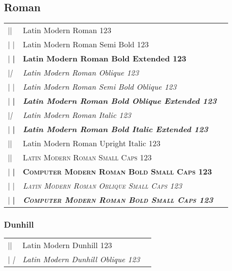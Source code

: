 \documentclass[a4paper]{article}
\makeatletter
\newenvironment{vrb}{\begin{tabular}{@{}p{5cm}ll@{}}}{\end{tabular}}
\def\samplefont{\edef\savedname{\fontname\font}{\normalfont\ttfamily\savedname}}
\def\samplefont{}
\makeatother
\begin{document}
\subsection*{Roman}

\rmfamily
\begin{vrb}
|\rmfamily| & {Latin Modern Roman 123} & {\samplefont} \\
|  \sbweight| & {\sbweight Latin Modern Roman Semi Bold 123} & {\sbweight\samplefont} \\
|  \bfseries| & {\bfseries Latin Modern Roman Bold Extended 123} & {\bfseries\samplefont} \\
|\slshape| & {\slshape Latin Modern Roman Oblique 123} & {\slshape\samplefont} \\
|  \sbweight| & {\sbweight\slshape Latin Modern Roman Semi Bold Oblique 123} & {\sbweight\slshape\samplefont} \\
|  \bfseries| & {\bfseries\slshape Latin Modern Roman Bold Oblique Extended 123} & {\bfseries\slshape\samplefont} \\
|\itshape| & {\itshape Latin Modern Roman Italic 123} & {\itshape\samplefont} \\
|  \bfseries| & {\bfseries\itshape Latin Modern Roman Bold Italic Extended 123} & {\bfseries\itshape\samplefont} \\
|\uishape| & {\uishape Latin Modern Roman Upright Italic 123} & {\uishape\samplefont} \\
|\scshape| & {\scshape Latin Modern Roman Small Caps 123} & {\scshape\samplefont} \\
|  \bfseries| & {\bfseries\scshape Computer Modern Roman Bold Small Caps 123} & {\bfseries\scshape\samplefont} \\
|  \sishape| & {\scshape\slshape Latin Modern Roman Oblique Small Caps 123} & {\scshape\slshape\samplefont} \\
|    \bfseries| & {\slshape\bfseries\scshape Computer Modern Roman Bold Small Caps 123} & {\slshape\bfseries\scshape\samplefont} \\
\end{vrb}

\subsubsection*{Dunhill}

\tistyle
\begin{vrb}
|\tistyle | & {Latin Modern Dunhill 123} \\
|  \slshape| & {\slshape Latin Modern Dunhill Oblique 123} \\
\end{vrb}
\end{document}
